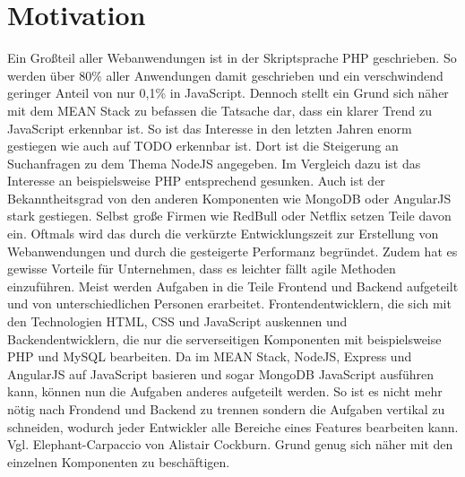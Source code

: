 \section{Motivation}\label{motivation-markus}

Ein Großteil aller Webanwendungen ist in der Skriptsprache PHP geschrieben. 
So werden über 80\% aller Anwendungen damit geschrieben und ein verschwindend geringer Anteil von nur 0,1\% in JavaScript.
Dennoch stellt ein Grund sich näher mit dem MEAN Stack zu befassen die Tatsache dar, dass ein klarer Trend zu JavaScript erkennbar ist.
So ist das Interesse in den letzten Jahren enorm gestiegen wie auch auf TODO erkennbar ist.
Dort ist die Steigerung an Suchanfragen zu dem Thema NodeJS angegeben.
Im Vergleich dazu ist das Interesse an beispielsweise PHP entsprechend gesunken. 
Auch ist der Bekanntheitsgrad von den anderen Komponenten wie MongoDB oder AngularJS stark gestiegen.
Selbst große Firmen wie RedBull oder Netflix setzen Teile davon ein.
Oftmals wird das durch die verkürzte Entwicklungszeit zur Erstellung von Webanwendungen und durch die gesteigerte Performanz begründet.
Zudem hat es gewisse Vorteile für Unternehmen, dass es leichter fällt agile Methoden einzuführen.
Meist werden Aufgaben in die Teile Frontend und Backend aufgeteilt und von unterschiedlichen Personen erarbeitet.
Frontendentwicklern, die sich mit den Technologien HTML, CSS und JavaScript auskennen und Backendentwicklern, die nur die serverseitigen Komponenten mit beispielsweise PHP und MySQL bearbeiten.
Da im MEAN Stack, NodeJS, Express und AngularJS auf JavaScript basieren und sogar MongoDB JavaScript ausführen kann, können nun die Aufgaben anderes aufgeteilt werden.
So ist es nicht mehr nötig nach Frondend und Backend zu trennen sondern die Aufgaben vertikal zu schneiden, wodurch jeder Entwickler alle Bereiche eines Features bearbeiten kann.
Vgl. Elephant-Carpaccio von Alistair Cockburn. 
Grund genug sich näher mit den einzelnen Komponenten zu beschäftigen.